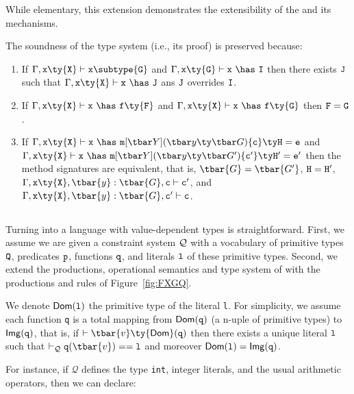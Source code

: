 While elementary, this extension demonstrates the extensibility of the \FXGL{\cdot} and its mechanisms.

The soundness of the type system (i.e., its proof) is preserved because:
\begin{enumerate}
\item If $\Gamma,{\tt x}\ty{\tt X}\vdash{\tt x}\subtype{\tt G}$ and $\Gamma,{\tt x}\ty{\tt G}\vdash{\tt x}~\has~{\tt I}$ then there exists $\tt J$ such that $\Gamma,{\tt x}\ty{\tt X}\vdash{\tt x}~\has~{\tt J}$ ans $\tt J$ overrides $\tt I$.
\item
If $\Gamma,{\tt x}\ty{\tt X}\vdash{\tt x}~\has~{\tt f}\ty{\tt F}$ and  $\Gamma,{\tt x}\ty{\tt X}\vdash{\tt x}~\has~{\tt f}\ty{\tt G}$ then ${\tt F}={\tt G}$.
\item
If $\Gamma,{\tt x}\ty{\tt X}\vdash{\tt x}~\has~\minst{Y}{y}{G}{c}{H}{e}$ and $\Gamma,{\tt x}\ty{\tt X}\vdash{\tt x}~\has~\minst{Y}{y}{G'}{c'}{H'}{e'}$ then the method signatures are equivalent, that is, $\tbar{G}=\tbar{G'}$, ${\tt H}={\tt H'}$, $\Gamma,{\tt x}\ty{\tt X},\tbar{y}:\tbar{G},{\tt c}\vdash {\tt c'}$, and $\Gamma,{\tt x}\ty{\tt X},\tbar{y}:\tbar{G},{\tt c'}\vdash{\tt c}$.
\end{enumerate}


\subsection{}

Turning \FXGL{\cdot} into a language with value-dependent types is straightforward.
First, we assume we are given a constraint system $\cal Q$ with a vocabulary of primitive types ${\tt Q}$,
predicates ${\tt p}$, functions ${\tt q}$, and literals ${\tt l}$ of these primitive types. Second, we extend the productions, operational semantics and type system of \FXGL{\cdot} with the productions and rules of Figure~\ref{fig:FXGQ}.


We denote ${\sf Dom}({\tt l})$ the primitive type of the literal {\tt l}. For simplicity, we assume each function {\tt q}
is a total mapping from ${\sf Dom}({\tt q})$ (a n-uple of primitive types) to ${\sf Img}({\tt q})$, that is, if $\vdash \tbar{v}\ty{\sf Dom}({\tt q})$ then there exists a unique literal $\tt l$ such that $\vdashQ {\tt q}(\tbar{v})=={\tt l}$ and moreover ${\sf Dom}({\tt l})={\sf Img}({\tt q})$.

For instance, if $\mathcal{Q}$ defines the type {\tt int}, integer literals, and the usual arithmetic operators, then we can declare:


